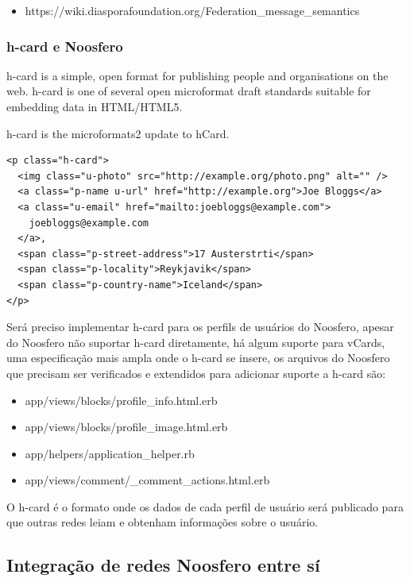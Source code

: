 \documentclass[12pt]{article}
\begin{document}
\begin{itemize}
  \item https://wiki.diasporafoundation.org/Federation\_message\_semantics
\end{itemize}

\subsubsection{h-card e Noosfero}

h-card is a simple, open format for publishing people and organisations on the web. h-card is one of several open microformat draft standards suitable for embedding data in HTML/HTML5.

h-card is the microformats2 update to hCard.

\begin{framed}
\begin{lstlisting}[caption=Exemplo de h-card]
<p class="h-card">
  <img class="u-photo" src="http://example.org/photo.png" alt="" />
  <a class="p-name u-url" href="http://example.org">Joe Bloggs</a>
  <a class="u-email" href="mailto:joebloggs@example.com">
    joebloggs@example.com
  </a>, 
  <span class="p-street-address">17 Austerstrti</span>
  <span class="p-locality">Reykjavik</span>
  <span class="p-country-name">Iceland</span>
</p>
\end{lstlisting}
\end{framed}

Será preciso implementar h-card para os perfils de usuários do Noosfero,
apesar do Noosfero não suportar h-card diretamente, há algum suporte para
vCards, uma especificação mais ampla onde o h-card se insere, os arquivos do
Noosfero que precisam ser verificados e extendidos para adicionar suporte a
h-card são:

\begin{itemize}
  \item app/views/blocks/profile\_info.html.erb
  \item app/views/blocks/profile\_image.html.erb
  \item app/helpers/application\_helper.rb
  \item app/views/comment/\_comment\_actions.html.erb
\end{itemize}

O h-card é o formato onde os dados de cada perfil de usuário será publicado
para que outras redes leiam e obtenham informações sobre o usuário.

\subsection{Integração de redes Noosfero entre sí}
\end{document}
